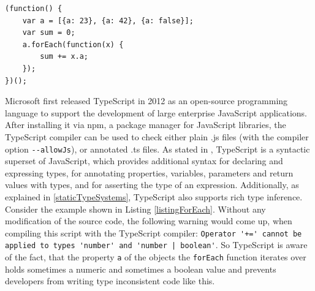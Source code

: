 \documentclass[runningheads,a4paper]{llncs}
\begin{document}
\medskip\medskip
\lstset{language=javascript}
\begin{minipage}{\linewidth}
\begin{lstlisting}[frame=single, caption=Inconsistent ForEach, label=listingForEach]
(function() {
    var a = [{a: 23}, {a: 42}, {a: false}];
    var sum = 0;
    a.forEach(function(x) {
        sum += x.a;
    });
})();
\end{lstlisting}
\end{minipage}
Microsoft first released TypeScript in 2012 as an open-source programming language to support the development of large enterprise JavaScript applications. 
After installing it via npm, a package manager for JavaScript libraries, the TypeScript compiler can be used to check either plain .js files (with the compiler option  \lstinline[columns=fixed]{--allowJs}), or annotated .ts files.
As stated in \cite{DBLP:conf/ecoop/BiermanAT14}, TypeScript is a syntactic superset of JavaScript, which provides additional syntax for declaring and expressing types, for annotating properties, variables, parameters and return values with types, and for asserting the type of an expression.
Additionally, as explained in \ref{staticTypeSystems}, TypeScript also supports rich type inference.
Consider the example shown in Listing \ref{listingForEach}.
Without any modification of the source code, the following warning would come up, when compiling this script with the TypeScript compiler:
\lstinline[columns=fixed]{Operator '+=' cannot be applied to types 'number' and 'number | boolean'}.
So TypeScript is aware of the fact, that the property \lstinline[columns=fixed]{a} of the objects the \lstinline[columns=fixed]{forEach} function iterates over holds sometimes a numeric and sometimes a boolean value and prevents developers from writing type inconsistent code like this.
\end{document}
